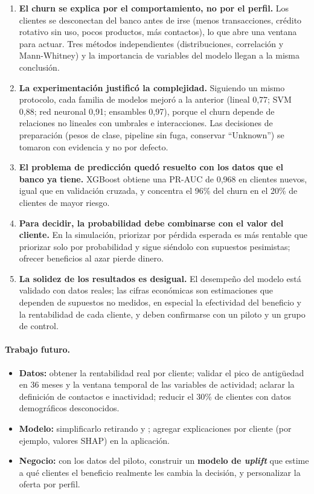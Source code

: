 \documentclass[11pt,a4paper]{article}
\newcommand{\var}[1]{\texttt{\detokenize{#1}}}
\begin{document}
\begin{enumerate}
  \item \textbf{El churn se explica por el comportamiento, no por el perfil.} Los clientes se desconectan del banco antes de irse (menos transacciones, crédito rotativo sin uso, pocos productos, más contactos), lo que abre una ventana para actuar. Tres métodos independientes (distribuciones, correlación y Mann-Whitney) y la importancia de variables del modelo llegan a la misma conclusión.
  \item \textbf{La experimentación justificó la complejidad.} Siguiendo un mismo protocolo, cada familia de modelos mejoró a la anterior (lineal 0,77; SVM 0,88; red neuronal 0,91; ensambles 0,97), porque el churn depende de relaciones no lineales con umbrales e interacciones. Las decisiones de preparación (pesos de clase, pipeline sin fuga, conservar ``Unknown'') se tomaron con evidencia y no por defecto.
  \item \textbf{El problema de predicción quedó resuelto con los datos que el banco ya tiene.} XGBoost obtiene una PR-AUC de 0,968 en clientes nuevos, igual que en validación cruzada, y concentra el 96\% del churn en el 20\% de clientes de mayor riesgo.
  \item \textbf{Para decidir, la probabilidad debe combinarse con el valor del cliente.} En la simulación, priorizar por pérdida esperada es más rentable que priorizar solo por probabilidad y sigue siéndolo con supuestos pesimistas; ofrecer beneficios al azar pierde dinero.
  \item \textbf{La solidez de los resultados es desigual.} El desempeño del modelo está validado con datos reales; las cifras económicas son estimaciones que dependen de supuestos no medidos, en especial la efectividad del beneficio y la rentabilidad de cada cliente, y deben confirmarse con un piloto y un grupo de control.
\end{enumerate}

\paragraph{Trabajo futuro.}
\begin{itemize}
  \item \textbf{Datos:} obtener la rentabilidad real por cliente; validar el pico de antigüedad en 36 meses y la ventana temporal de las variables de actividad; aclarar la definición de contactos e inactividad; reducir el 30\% de clientes con datos demográficos desconocidos.
  \item \textbf{Modelo:} simplificarlo retirando \var{avg_ticket} y \var{avg_utilization_ratio}; agregar explicaciones por cliente (por ejemplo, valores SHAP) en la aplicación.
  \item \textbf{Negocio:} con los datos del piloto, construir un \textbf{modelo de \emph{uplift}} que estime a qué clientes el beneficio realmente les cambia la decisión, y personalizar la oferta por perfil.
\end{itemize}
\end{document}
